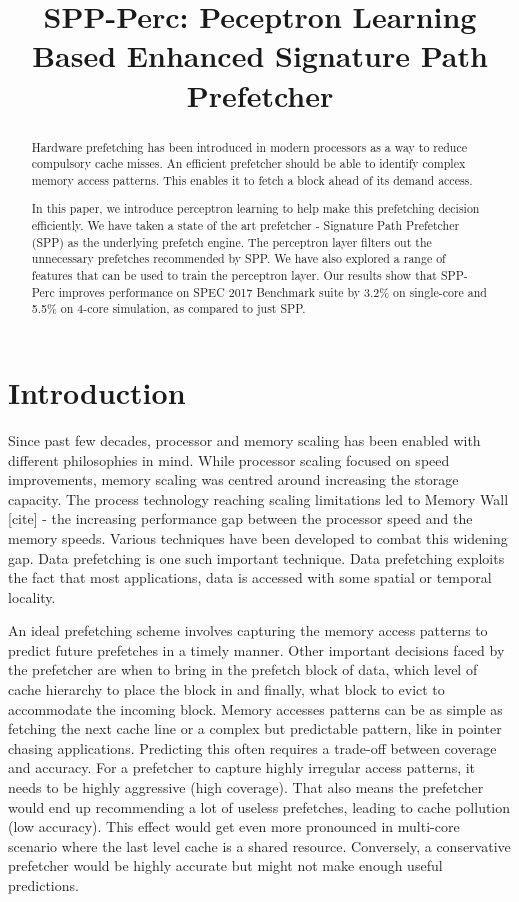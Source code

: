 \documentclass{sig-alternate}
\title{SPP-Perc: Peceptron Learning Based Enhanced Signature Path Prefetcher}
\author{}
\begin{document}
\maketitle
\thispagestyle{firstpage}
\pagestyle{plain}

\begin{abstract}

Hardware prefetching has been introduced in modern processors as a way to reduce compulsory cache misses. An efficient prefetcher should be able to identify complex memory access patterns. This enables it to fetch a block ahead of its demand access. 

In this paper, we introduce perceptron learning to help make this prefetching decision efficiently. We have taken a state of the art prefetcher - Signature Path Prefetcher (SPP) as the underlying prefetch engine. The perceptron layer filters out the unnecessary prefetches recommended by SPP. We have also explored a range of features that can be used to train the perceptron layer. Our results show that SPP-Perc improves performance on SPEC 2017 Benchmark suite by 3.2\% on single-core and 5.5\% on 4-core simulation, as compared to just SPP.

\end{abstract}

\section{Introduction}
Since past few decades, processor and memory scaling has been enabled with different philosophies in mind. While processor scaling focused on speed improvements, memory scaling was centred around increasing the storage capacity. The process technology reaching scaling limitations led to Memory Wall [cite] - the increasing performance gap between the processor speed and the memory speeds. Various techniques have been developed to combat this widening gap. Data prefetching is one such important technique. Data prefetching exploits the fact that most applications, data is accessed with some spatial or temporal locality.

An ideal prefetching scheme involves capturing the memory access patterns to predict future prefetches in a timely manner. Other important decisions faced by the prefetcher are when to bring in the prefetch block of data, which level of cache hierarchy to place the block in and finally, what block to evict to accommodate the incoming block. Memory accesses patterns can be as simple as fetching the next cache line or a complex but predictable pattern, like in pointer chasing applications. Predicting this often requires a trade-off between coverage and accuracy. For a prefetcher to capture highly irregular access patterns, it needs to be highly aggressive (high coverage). That also means the prefetcher would end up recommending a lot of useless prefetches, leading to cache pollution (low accuracy). This effect would get even more pronounced in multi-core scenario where the last level cache is a shared resource. Conversely, a conservative prefetcher would be highly accurate but might not make enough useful predictions.
\end{document}
